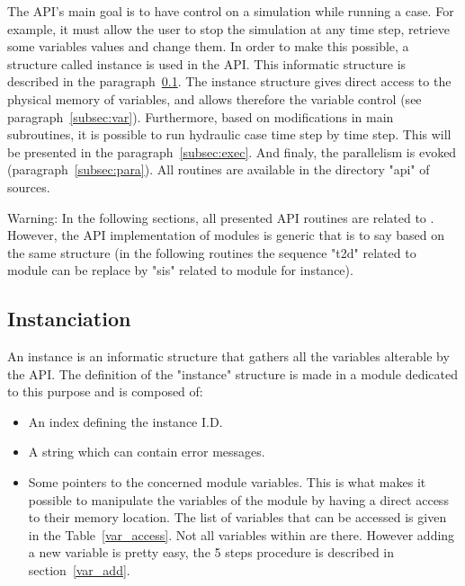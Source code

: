 The API’s main goal is to have control on a simulation while running a case.
For example, it must allow the user to stop the simulation at any time step,
retrieve some variables values and change them. In order to make this possible,
a \fortran structure called instance is used in the API\@. This informatic
structure is described in the paragraph~\ref{subsec:instan}. The instance
structure gives direct access to the physical memory of variables, and allows
therefore the variable control (see paragraph~\ref{subsec:var}). Furthermore,
based on modifications in \telemacsystem main subroutines, it is possible to
run hydraulic case time step by time step. This will be
presented in the paragraph~\ref{subsec:exec}. And finaly, the parallelism is
evoked (paragraph~\ref{subsec:para}).
All \fortran routines are available in the directory "api" of \telemacsystem
sources.

\begin{WarningBlock}{Warning:}
\centering
 In the following sections, all presented API routines are related to
 . However, the API implementation of \telemacsystem modules is
 generic that is to say based on the same structure (in the following routines
 the sequence "t2d" related to  module can be replace by "sis"
 related to \sisyphe module for instance).
\end{WarningBlock}

\subsection{Instanciation}
\label{subsec:instan}
An instance is an informatic structure that gathers all the variables alterable
by the API\@. The definition of the "instance" structure is made in a \fortran
module dedicated to this purpose and is composed of:

\begin{itemize}
\item An index defining the instance I.D.
\item A string which can contain error messages.
\item Some pointers to the concerned module variables. This is what makes it
  possible to manipulate the variables of the module by having a direct access
  to their memory location. The list of variables that can be accessed is given
  in the Table~\ref{var_access}. Not all variables within  are
  there. However adding a new variable is pretty easy, the 5 steps procedure is
  described in section~\ref{var_add}.
\end{itemize}

